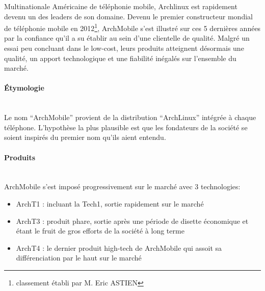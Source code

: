 Multinationale Américaine de téléphonie mobile, Archlinux 
est rapidement devenu un des leaders de son domaine.
Devenu le premier constructeur mondial de téléphonie mobile 
en 2012\footnote{classement établi par M. Eric ASTIEN},
ArchMobile s'est illustré sur ces 5 dernières années par
la confiance qu'il a su établir au sein d'une clientelle 
de qualité. Malgré un essai peu concluant dans le low-cost,
leurs produits atteignent désormais une qualité, un apport
technologique et une fiabilité inégalés sur l'ensemble du
marché.

\paragraph{\'Etymologie}~\\
Le nom ``ArchMobile'' provient de la distribution ``ArchLinux''
intégrée à  chaque téléphone. L'hypothèse la plus plausible
est que les fondateurs de la société se soient inspirés du premier
nom qu'ils aient entendu.

\paragraph{Produits}~\\
ArchMobile s'est imposé progressivement sur le marché avec 3 technologies:
\begin{itemize}
\item ArchT1 : incluant la Tech1, sortie rapidement sur le marché
\item ArchT3 : produit phare, sortie après une période de disette 
  économique et étant le fruit de gros efforts de la société à long terme
\item ArchT4 : le dernier produit high-tech de ArchMobile qui assoit
  sa différenciation par le haut sur le marché
\end{itemize}
